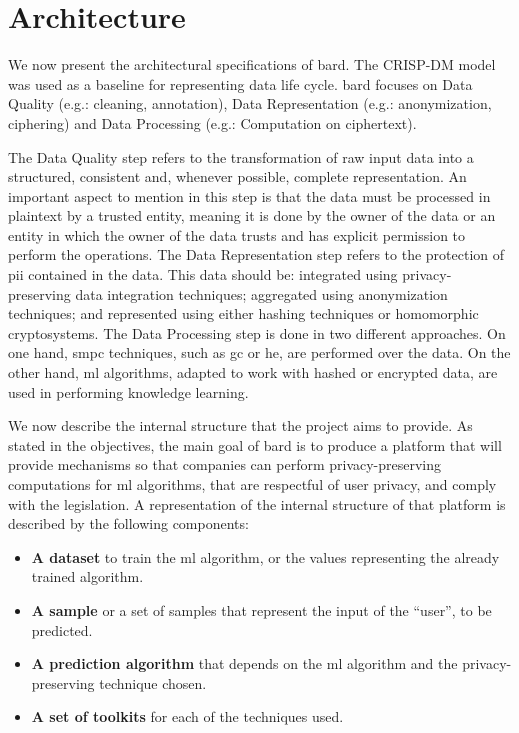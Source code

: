 
\section{Architecture}
\label{sec:Architecture}


We now present the architectural specifications of \ac{bard}. The CRISP-DM model was used as a baseline for representing data life cycle. \ac{bard} focuses on Data Quality (e.g.: cleaning, annotation), Data Representation (e.g.: anonymization, ciphering) and Data Processing (e.g.: Computation on ciphertext).

The Data Quality step refers to the transformation of raw input data into a structured, consistent and, whenever possible, complete representation. An important aspect to mention in this step is that the data must be processed in plaintext by a trusted entity, meaning it is done by the owner of the data or an entity in which the owner of the data trusts and has explicit permission to perform the operations.
The Data Representation step refers to the protection of \ac{pii} contained in the data. This data should be: integrated using privacy-preserving data integration techniques; aggregated using anonymization techniques; and represented using either hashing techniques or homomorphic cryptosystems.
The Data Processing step is done in two different approaches. On one hand, \ac{smpc} techniques, such as \ac{gc} or \ac{he}, are performed over the data. On the other hand, \ac{ml} algorithms, adapted to work with hashed or encrypted data, are used in performing knowledge learning.

We now describe the internal structure that the project aims to provide.
As stated in the objectives, the main goal of \ac{bard} is to produce a platform that will provide mechanisms so that companies can perform privacy-preserving computations for \ac{ml} algorithms, that are respectful of user privacy, and comply with the legislation. A representation of the internal structure of that platform is described by the following components: 
\begin{itemize}
	\item \textbf{A dataset} to train the \ac{ml} algorithm, or the values representing the already trained algorithm.
	\item \textbf{A sample} or a set of samples that represent the input of the ``user'', to be predicted.
	\item \textbf{A prediction algorithm} that depends on the \ac{ml} algorithm and the privacy-preserving technique chosen.
	\item \textbf{A set of toolkits} for each of the techniques used.
\end{itemize}

